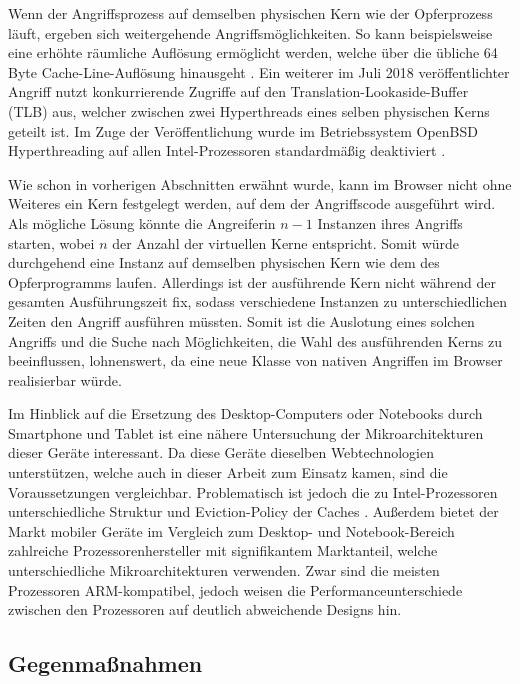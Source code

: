 Wenn der Angriffsprozess auf demselben physischen Kern wie der Opferprozess läuft, ergeben sich weitergehende Angriffsmöglichkeiten.
So kann beispielsweise eine erhöhte räumliche Auflösung ermöglicht werden, welche über die übliche 64 Byte Cache-Line-Auflösung hinausgeht \cite{MemJam}.
Ein weiterer im Juli 2018 veröffentlichter Angriff \cite{TLBleed} nutzt konkurrierende Zugriffe auf den Translation-Lookaside-Buffer (TLB) aus, welcher zwischen zwei Hyperthreads eines selben physischen Kerns geteilt ist.
Im Zuge der Veröffentlichung wurde im Betriebssystem OpenBSD Hyperthreading auf allen Intel-Prozessoren standardmäßig deaktiviert \cite{OpenBSDHyperthreading}.

Wie schon in vorherigen Abschnitten erwähnt wurde, kann im Browser nicht ohne Weiteres ein Kern festgelegt werden, auf dem der Angriffscode ausgeführt wird.
Als mögliche Lösung könnte die Angreiferin $n-1$ Instanzen ihres Angriffs starten, wobei $n$ der Anzahl der virtuellen Kerne entspricht. 
Somit würde durchgehend eine Instanz auf demselben physischen Kern wie dem des Opferprogramms laufen.
Allerdings ist der ausführende Kern nicht während der gesamten Ausführungszeit fix, sodass verschiedene Instanzen zu unterschiedlichen Zeiten den Angriff ausführen müssten.
Somit ist die Auslotung eines solchen Angriffs und die Suche nach Möglichkeiten, die Wahl des ausführenden Kerns zu beeinflussen, lohnenswert, da eine neue Klasse von nativen Angriffen im Browser realisierbar würde.


Im Hinblick auf die Ersetzung des Desktop-Computers oder Notebooks durch Smartphone und Tablet ist eine nähere Untersuchung der Mikroarchitekturen dieser Geräte interessant.
Da diese Geräte dieselben Webtechnologien unterstützen, welche auch in dieser Arbeit zum Einsatz kamen, sind die Voraussetzungen vergleichbar.
Problematisch ist jedoch die zu Intel-Prozessoren unterschiedliche Struktur und Eviction-Policy der Caches \cite{ARMCacheAttacks}.
Außerdem bietet der Markt mobiler Geräte im Vergleich zum Desktop- und Notebook-Bereich zahlreiche Prozessorenhersteller mit signifikantem Marktanteil, welche unterschiedliche Mikroarchitekturen verwenden.
Zwar sind die meisten Prozessoren ARM-kompatibel, jedoch weisen die Performanceunterschiede zwischen den Prozessoren \cite{GeekbenchMobile} auf deutlich abweichende Designs hin. 

\subsection{Gegenmaßnahmen} 

